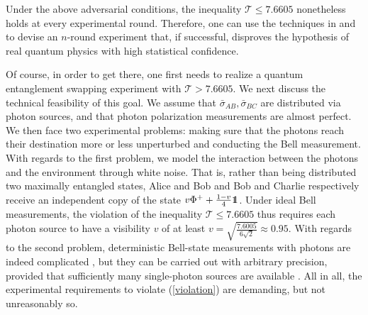 \documentclass[onecolumn,prx,amsmath,amssymb]{revtex4-2}
\begin{document}
\begin{appendix}
Under the above adversarial conditions, the inequality $\mathscr{T}\leq 7.6605$ nonetheless holds at every experimental round. Therefore, one can use the techniques in \cite{Elkouss} and \cite{Mateus} to devise an $n$-round experiment that, if successful, disproves the hypothesis of real quantum physics with high statistical confidence.

Of course, in order to get there, one first needs to realize a quantum entanglement swapping experiment with $\mathscr{T}>7.6605$. We next discuss the technical feasibility of this goal. We assume that $\bar{\sigma}_{AB},\bar{\sigma}_{BC}$ are distributed via photon sources, and that photon polarization measurements are almost perfect. We then face two experimental problems: making sure that the photons reach their destination more or less unperturbed and conducting the Bell measurement. With regards to the first problem, we model the interaction between the photons and the environment through white noise. That is, rather than being distributed two maximally entangled states, Alice and Bob and Bob and Charlie respectively receive an independent copy of the state $v\Phi^++\frac{1-v}{4}\openone$. Under ideal Bell measurements, the violation of the inequality $\mathscr{T}\leq 7.6605$ thus requires each photon source to have a visibility $v$ of at least $v=\sqrt{\frac{7.6005}{6\sqrt{2}}}\approx 0.95$. With regards to the second problem, deterministic Bell-state measurements with photons are indeed complicated \cite{Bell_meas_impossible}, but they can be carried out with arbitrary precision, provided that sufficiently many single-photon sources are available \cite{Bell_meas_possible}. All in all, the experimental requirements to violate (\ref{violation}) are demanding, but not unreasonably so.


\end{appendix}
\end{document}
